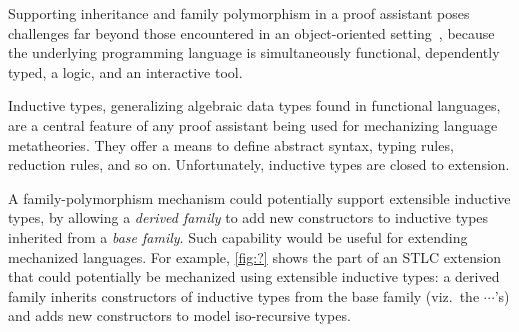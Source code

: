 Supporting inheritance and family polymorphism in a proof assistant poses challenges
far beyond those encountered in an object-oriented setting~\cite{ncm2004,vc-calculus-2006,zm2017},
because the underlying programming language is simultaneously
functional, dependently typed, a logic, and an interactive tool.


Inductive types, generalizing algebraic data types found in
functional languages, are a central feature of any proof assistant being
used for mechanizing language metatheories.
They offer a means to define abstract syntax, typing rules, reduction
rules, and so on.
Unfortunately, inductive types are closed to extension.

A family-polymorphism mechanism could potentially support extensible
inductive types, by allowing a \emph{derived family} to add new constructors
to inductive types inherited from a \emph{base family}.
Such capability would be useful for extending mechanized languages.
For example, \cref{fig:?} shows the part of an STLC extension that could
potentially be mechanized using extensible inductive types: a derived family
inherits constructors of inductive types from the base family (viz.\ the $\cdots$'s)
and adds new constructors to model iso-recursive types.

